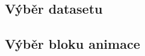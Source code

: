 \subsection{Výběr datasetu} \label{sec:Vyber_datasetu}

\subsection{Výběr bloku animace} \label{sec:Vyber_bloku_animace}







